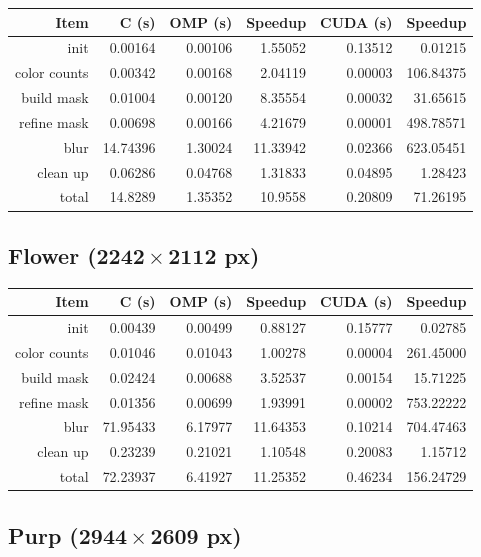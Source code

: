 \documentclass[12pt]{article}
\begin{document}
\begin{tabular}{r|r|r|r|r|r}
    Item & C (s) & OMP (s) & Speedup & CUDA (s) & Speedup
\\  \hline
    init & 0.00164 & 0.00106 & 1.55052 & 0.13512 & 0.01215
\\  color counts & 0.00342 & 0.00168 & 2.04119 & 0.00003 & 106.84375
\\  build mask & 0.01004 & 0.00120 & 8.35554 & 0.00032 & 31.65615
\\  refine mask & 0.00698 & 0.00166 & 4.21679 & 0.00001 & 498.78571
\\  blur & 14.74396 & 1.30024 & 11.33942 & 0.02366 & 623.05451
\\  clean up & 0.06286 & 0.04768 & 1.31833 & 0.04895 & 1.28423
\\  \hline
    total & 14.8289 & 1.35352 & 10.9558 & 0.20809 & 71.26195
\end{tabular}

\subsection{Flower ($\mathbf{2242 \times 2112}$ px)}

\begin{tabular}{r|r|r|r|r|r}
    Item & C (s) & OMP (s) & Speedup & CUDA (s) & Speedup
\\  \hline
    init & 0.00439 & 0.00499 & 0.88127 & 0.15777 & 0.02785
\\  color counts & 0.01046 & 0.01043 & 1.00278 & 0.00004 & 261.45000
\\  build mask & 0.02424 & 0.00688 & 3.52537 & 0.00154 & 15.71225
\\  refine mask & 0.01356 & 0.00699 & 1.93991 & 0.00002 & 753.22222
\\  blur & 71.95433 & 6.17977 & 11.64353 & 0.10214 & 704.47463
\\  clean up & 0.23239 & 0.21021 & 1.10548 & 0.20083 & 1.15712
\\  \hline
    total & 72.23937 & 6.41927 & 11.25352 & 0.46234 & 156.24729
\end{tabular}

\subsection{Purp ($\mathbf{2944 \times 2609}$ px)}
\end{document}
